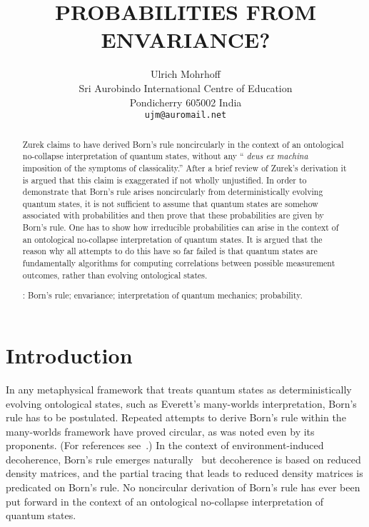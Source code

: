\documentclass[12pt]{article}
\begin{document}
\setlength{\baselineskip}{16.5pt}
\title{PROBABILITIES FROM ENVARIANCE?}
\author{Ulrich Mohrhoff\\
Sri Aurobindo International Centre of Education\\
Pondicherry 605002 India\\
\normalsize\tt ujm@auromail.net}
\date{}
\maketitle
\begin{abstract}
\noindent Zurek claims to have derived Born's rule noncircularly in the context of 
an ontological no-collapse interpretation of quantum states, without any ``{\it 
deus ex machina\/} imposition of the symptoms of classicality.'' After a brief 
review of Zurek's derivation it is argued that this claim is exaggerated if not 
wholly unjustified. In order to demonstrate that Born's rule arises noncircularly 
from deterministically evolving quantum states, it is not sufficient to assume that 
quantum states are somehow associated with probabilities and then prove that 
these probabilities are given by Born's rule. One has to show how irreducible 
probabilities can arise in the context of an ontological no-collapse interpretation 
of quantum states. It is argued that the reason why all attempts to do this have 
so far failed is that quantum states are fundamentally algorithms for computing 
correlations between possible measurement outcomes, rather than evolving 
ontological states.

\vspace{6pt}: Born's rule; envariance; 
interpretation of quantum mechanics; probability.
\setlength{\baselineskip}{14pt}
\end{abstract}

\section{\large Introduction}
In any metaphysical framework that treats quantum states as deterministically 
evolving ontological states, such as Everett's many-worlds interpretation, Born's 
rule has to be postulated. Repeated attempts to derive Born's rule within the 
many-worlds framework have proved circular, as was noted even by its 
proponents. (For references see~\cite{ZurekRMP}.) In the context of 
environment-induced decoherence, Born's rule emerges 
naturally~\cite{ZurekRG} but decoherence is based on reduced density matrices, 
and the partial tracing that leads to reduced density matrices is predicated on 
Born's rule. No noncircular derivation of Born's rule has ever been put forward in 
the context of an ontological no-collapse interpretation of quantum states.
\end{document}
